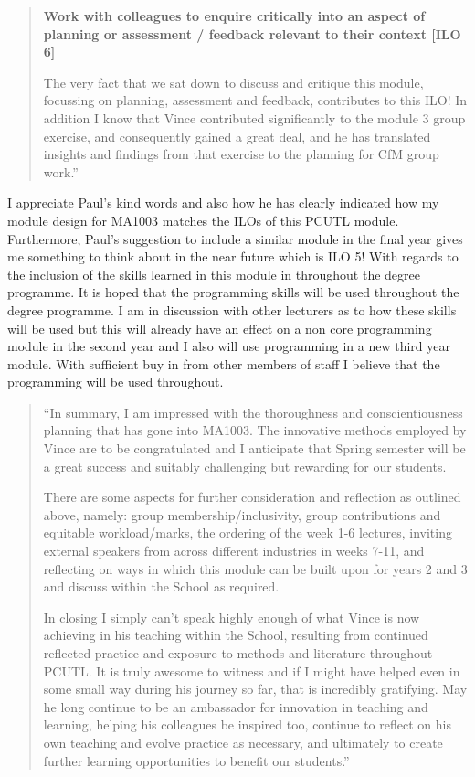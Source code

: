 \documentclass{article}
\begin{document}
\begin{quote}
\textbf {Work with colleagues to enquire critically into an aspect of planning or assessment / feedback relevant to their context [ILO 6]}

The very fact that we sat down to discuss and critique this module, focussing on planning, assessment and feedback, contributes to this ILO! In addition I know that Vince contributed significantly to the module 3 group exercise, and consequently gained a great deal, and he has translated insights and findings from that exercise to the planning for CfM group work.''\end{quote}

I appreciate Paul's kind words and also how he has clearly indicated how my module design for MA1003 matches the ILOs of this PCUTL module. Furthermore, Paul's suggestion to include a similar module in the final year gives me something to think about in the near future which is ILO 5! With regards to the inclusion of the skills learned in this module in throughout the degree programme. It is hoped that the programming skills will be used throughout the degree programme. I am in discussion with other lecturers as to how these skills will be used but this will already have an effect on a non core programming module in the second year and I also will use programming in a new third year module. With sufficient buy in from other members of staff I believe that the programming will be used throughout.

\begin{quote}
``In summary, I am impressed with the thoroughness and conscientiousness planning that has gone into MA1003. The innovative methods employed by Vince are to be congratulated and I anticipate that Spring semester will be a great success and suitably challenging but rewarding for our students.

There are some aspects for further consideration and reflection as outlined above, namely: group membership/inclusivity, group contributions and equitable workload/marks, the ordering of the week 1-6 lectures, inviting external speakers from across different industries in weeks 7-11, and reflecting on ways in which this module can be built upon for years 2 and 3 and discuss within the School as required.

In closing I simply can't speak highly enough of what Vince is now achieving in his teaching within the School, resulting from continued reflected practice and exposure to methods and literature throughout PCUTL. It is truly awesome to witness and if I might have helped even in some small way during his journey so far, that is incredibly gratifying.  May he long continue to be an ambassador for innovation in teaching and learning, helping his colleagues be inspired too, continue to reflect on his own teaching and evolve practice as necessary, and ultimately to create further learning opportunities to benefit our students.''\end{quote}
\end{document}
